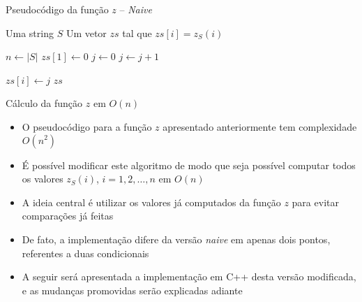 \begin{frame}[fragile]{Pseudocódigo da função $z$ -- {\it Naive}}

    \begin{algorithm}[H]
        \caption{Função $z$}
        \begin{algorithmic}[1]
            \Require Uma string $S$
            \Ensure Um vetor $zs$ tal que $zs[i] = z_S(i)$

                \State $n \gets |S|$
                \State $zs[1] \gets 0$
                \State 
                    \State $j \gets 0$
                        \State $j \gets j + 1$
                    \EndWhile

                    \State $zs[i] \gets j$
                \EndFor
                \State 
                \State \Return $zs$
            \EndFunction
        \end{algorithmic}
    \end{algorithm}

\end{frame}

\begin{frame}[fragile]{Cálculo da função $z$ em $O(n)$}

    \begin{itemize}
        \item O pseudocódigo para a função $z$ apresentado anteriormente tem complexidade
            $O(n^2)$
        \pause

        \item É possível modificar este algoritmo de modo que seja possível computar todos os
            valores $z_S(i)$, $i = 1, 2, \ldots, n$ em $O(n)$
        \pause

        \item A ideia central é utilizar os valores já computados da função $z$ para evitar 
            comparações já feitas
        \pause

        \item De fato, a implementação difere da versão \textit{naive} em apenas dois pontos,
            referentes a duas condicionais
        \pause

        \item A seguir será apresentada a implementação em C++ desta versão modificada, e
            as mudanças promovidas serão explicadas adiante
    \end{itemize}

\end{frame}

